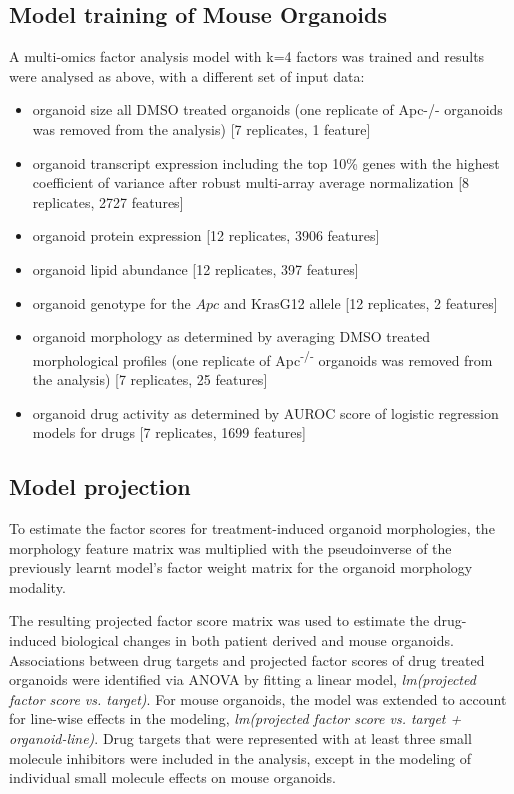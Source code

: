 \begin{flushleft}
\subsection{Model training of Mouse Organoids}
A multi-omics factor analysis model with k=4 factors was trained and results were analysed as above, with a different set of input data: 
\begin{itemize}
    \item organoid size all DMSO treated organoids (one replicate of Apc-/- organoids was removed from the analysis) [7 replicates, 1 feature]
    \item organoid transcript expression including the top 10\% genes with the highest coefficient of variance after robust multi-array average normalization [8 replicates, 2727 features]
    \item organoid protein expression [12 replicates, 3906 features]
    \item organoid lipid abundance [12 replicates, 397 features]
    \item organoid genotype for the $Apc$ and KrasG12 allele [12 replicates, 2 features]
    \item organoid morphology as determined by averaging DMSO treated morphological profiles (one replicate of Apc\textsuperscript{-/-} organoids was removed from the analysis) [7 replicates, 25 features]
    \item organoid drug activity as determined by AUROC score of logistic regression models for drugs [7 replicates, 1699 features]
\end{itemize}


\subsection{Model projection}
To estimate the factor scores for treatment-induced organoid morphologies, the morphology feature matrix was multiplied with the pseudoinverse of the previously learnt model's factor weight matrix for the organoid morphology modality. 

\smallbreak
The resulting projected factor score matrix was used to estimate the drug-induced biological changes in both patient derived and mouse organoids. Associations between drug targets and projected factor scores of drug treated organoids were identified via ANOVA by fitting a linear model, \textit{lm(projected factor score vs. target)}. For mouse organoids, the model was extended to account for line-wise effects in the modeling, \textit{lm(projected factor score vs. target + organoid-line)}. Drug targets that were represented with at least three small molecule inhibitors were included in the analysis, except in the modeling of individual small molecule effects on mouse organoids.



\end{flushleft}
